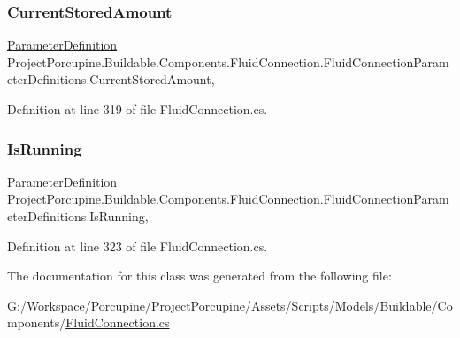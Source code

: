 \subsubsection{\texorpdfstring{Current\+Stored\+Amount}{CurrentStoredAmount}}
{\footnotesize\ttfamily \hyperlink{class_project_porcupine_1_1_buildable_1_1_components_1_1_buildable_component_1_1_parameter_definition}{Parameter\+Definition} Project\+Porcupine.\+Buildable.\+Components.\+Fluid\+Connection.\+Fluid\+Connection\+Parameter\+Definitions.\+Current\+Stored\+Amount\hspace{0.3cm}{\ttfamily [get]}, {\ttfamily [set]}}



Definition at line 319 of file Fluid\+Connection.\+cs.

\mbox{\label{class_project_porcupine_1_1_buildable_1_1_components_1_1_fluid_connection_1_1_fluid_connection_parameter_definitions_a1a45b39072698016e34c01f22fc42845}} 
\subsubsection{\texorpdfstring{Is\+Running}{IsRunning}}
{\footnotesize\ttfamily \hyperlink{class_project_porcupine_1_1_buildable_1_1_components_1_1_buildable_component_1_1_parameter_definition}{Parameter\+Definition} Project\+Porcupine.\+Buildable.\+Components.\+Fluid\+Connection.\+Fluid\+Connection\+Parameter\+Definitions.\+Is\+Running\hspace{0.3cm}{\ttfamily [get]}, {\ttfamily [set]}}



Definition at line 323 of file Fluid\+Connection.\+cs.



The documentation for this class was generated from the following file\+:\begin{DoxyCompactItemize}
\item 
G\+:/\+Workspace/\+Porcupine/\+Project\+Porcupine/\+Assets/\+Scripts/\+Models/\+Buildable/\+Components/\hyperlink{_fluid_connection_8cs}{Fluid\+Connection.\+cs}\end{DoxyCompactItemize}
